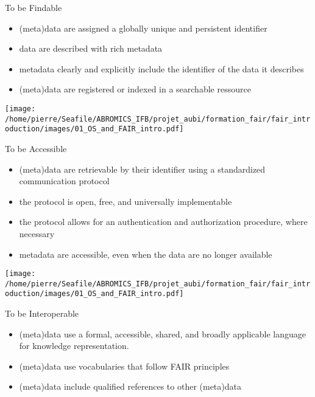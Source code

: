 \begin{frame}
\begin{block}{To be Findable}
\begin{itemize}
\item (meta)data are assigned a globally unique and persistent identifier
\item data are described with rich metadata
\item metadata clearly and explicitly include the identifier of the data it describes
\item (meta)data are registered or indexed in a searchable ressource
\end{itemize}
\end{block}
\end{frame}

\begin{frame}
\texttt{[image: /home/pierre/Seafile/ABROMICS\_IFB/projet\_aubi/formation\_fair/fair\_introduction/images/01\_OS\_and\_FAIR\_intro.pdf]}
\end{frame}

\begin{frame}
\begin{block}{To be Accessible}
\begin{itemize}
\item (meta)data are retrievable by their identifier using a standardized communication protocol
\item the protocol is open, free, and universally implementable
\item the protocol allows for an authentication and authorization procedure, where necessary
\item metadata are accessible, even when the data are no longer available
\end{itemize}
\end{block}
\end{frame}

\begin{frame}
\texttt{[image: /home/pierre/Seafile/ABROMICS\_IFB/projet\_aubi/formation\_fair/fair\_introduction/images/01\_OS\_and\_FAIR\_intro.pdf]}
\end{frame}

\begin{frame}
\begin{block}{To be Interoperable}
\begin{itemize}
\item (meta)data use a formal, accessible, shared, and broadly applicable language for knowledge representation.
\item (meta)data use vocabularies that follow FAIR principles
\item (meta)data include qualified references to other (meta)data
\end{itemize}
\end{block}
\end{frame}

